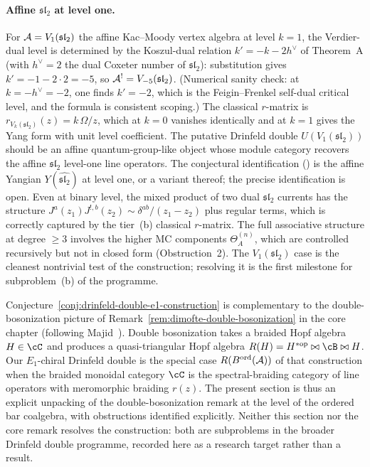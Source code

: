 \paragraph{Affine $\mathfrak{sl}_2$ at level one.}
For $\mathcal{A} = V_1(\mathfrak{sl}_2)$ the affine Kac--Moody
vertex algebra at level $k=1$, the Verdier-dual level is
determined by the Koszul-dual relation $k' = -k - 2h^\vee$
of Theorem~A (with $h^\vee = 2$ the dual Coxeter number of
$\mathfrak{sl}_2$): substitution gives
$k' = -1 - 2\cdot 2 = -5$, so
$\mathcal{A}^! = V_{-5}(\mathfrak{sl}_2)$. (Numerical sanity
check: at $k = -h^\vee = -2$, one finds $k' = -2$, which
is the Feigin--Frenkel self-dual critical level, and the
formula is consistent scoping.) The classical
$r$-matrix is
$r_{V_k(\mathfrak{sl}_2)}(z) = k\,\Omega/z$, which at
$k=0$ vanishes identically and at $k=1$
gives the Yang form with unit level coefficient. The putative
Drinfeld double
$U(V_1(\mathfrak{sl}_2))$ should be an affine
quantum-group-like object whose module category
recovers the affine $\mathfrak{sl}_2$ level-one line
operators. The conjectural identification (\ClaimStatusConjectured)
is the affine Yangian $Y(\widehat{\mathfrak{sl}_2})$ at level one,
or a variant thereof; the precise identification is open.
Even at binary level, the mixed product of two dual
$\mathfrak{sl}_2$ currents has the structure
$J^a(z_1)J^{!,b}(z_2) \sim \delta^{ab}/(z_1-z_2)$ plus
regular terms, which is correctly captured by
the tier~(b) classical $r$-matrix. The full
associative structure at degree $\ge 3$ involves the
higher MC components $\Theta_A^{(n)}$, which are
controlled recursively but not in closed form
(Obstruction~2). The $V_1(\mathfrak{sl}_2)$ case is
the cleanest nontrivial test of the construction;
resolving it is the first milestone for subproblem~(b)
of the programme.

\begin{remark}
\label{rem:drinfeld-e1-dimofte}
Conjecture~\ref{conj:drinfeld-double-e1-construction} is
complementary to the double-bosonization picture of
Remark~\ref{rem:dimofte-double-bosonization} in the core
chapter (following Majid~\cite{Majid95}). Double
bosonization takes a braided Hopf algebra $H\in\cC$ and
produces a quasi-triangular Hopf algebra
$R(H) = H^{*\mathrm{op}}\bowtie \cB\bowtie H$. Our
$E_1$-chiral Drinfeld double is the special case
$R(B^{\mathrm{ord}}(\mathcal{A}))$ of that construction when the
braided monoidal category $\cC$ is the spectral-braiding
category of line operators with meromorphic braiding
$r(z)$. The present section is thus an explicit
unpacking of the double-bosonization remark at the level
of the ordered bar coalgebra, with obstructions
identified explicitly. Neither this section nor the
core remark resolves the construction: both are
subproblems in the broader Drinfeld double programme,
recorded here as a research target rather than a
result.
\end{remark}

